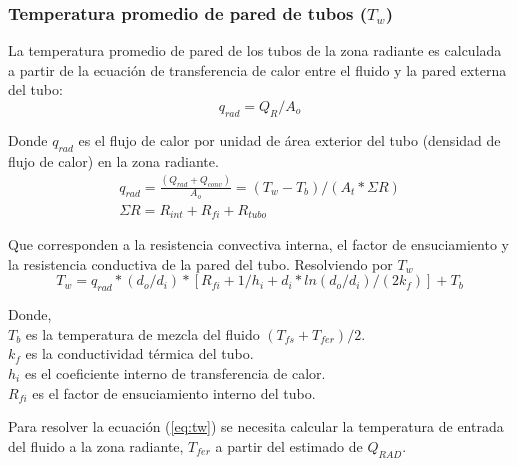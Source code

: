 \subsubsection{Temperatura promedio de pared de tubos ($T_w$)}
\par La temperatura promedio de pared de los tubos de la zona radiante es calculada a partir de la ecuación de transferencia de calor entre el fluido y la pared externa del tubo:
\begin{equation}
    q_{rad} = Q_R / A_o
\end{equation}
\par Donde $q_{rad}$ es el flujo de calor por unidad de área exterior del tubo (densidad de flujo de calor) en la zona radiante.
\begin{gather*}
q_{rad} = \frac{(Q_{rad} + Q_{conv})}{A_o} = (T_w - T_b) / (A_t *\Sigma R) \\
\Sigma R = R_{int} + R_{fi} + R_{tubo}
\end{gather*}
\par Que corresponden a la resistencia convectiva interna, el factor de ensuciamiento y la resistencia conductiva de la pared del tubo. Resolviendo por $T_w$
\begin{equation}
\label{eq:tw}
T_w = q_{rad} *(d_o/d_i) *[ R_{fi} + 1/h_i + d_i*ln(d_o/d_i)/(2k_f) ] +T_b
\end{equation}

\par Donde,\\
$T_b$ es la temperatura de mezcla del fluido $(T_{fs} + T_{fer})/2$. \\
$k_f$ es la conductividad térmica del tubo. \\
$h_i$ es el coeficiente interno de transferencia de calor. \\
$R_{fi}$ es el factor de ensuciamiento interno del tubo. \\

\par Para resolver la ecuación (\ref{eq:tw}) se necesita calcular la temperatura de entrada del fluido a la zona radiante, $T_{fer}$ a partir del estimado de $Q_{RAD}$. 

